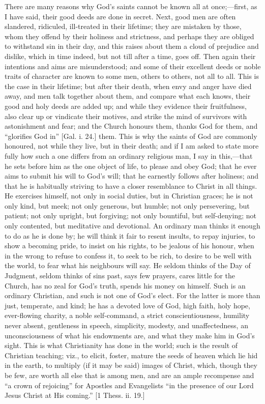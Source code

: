 There are many reasons why God's saints cannot be known all at
once;—first, as I have said, their good deeds are done in secret.
Next, good men are often slandered, ridiculed, ill-treated in their
lifetime; they are mistaken by those, whom they offend by their
holiness and strictness, and perhaps they are obliged to withstand sin
in their day, and this raises about them a cloud of prejudice and
dislike, which in time indeed, but not till after a time, goes off.
Then again their intentions and aims are misunderstood; and some of
their excellent deeds or noble traits of character are known to some
men, others to others, not all to all. This is the case in their
lifetime; but after their death, when envy and anger have died away,
and men talk together about them, and compare what each knows, their
good and holy deeds are added up; and while they evidence their
fruitfulness, also clear up or vindicate their motives, and strike the
mind of survivors with astonishment and fear; and the Church honours
them, thanks God for them, and ``glorifies God in'' [Gal. i.
24.] them. This is why the saints of God are commonly honoured, not
while they live, but in their death; and if I am asked to state more
fully how such a one differs from an ordinary religious man, I say in
this,—that he sets before him as the one object of life, to please
and obey God; that he ever aims to submit his will to God's will; that
he earnestly follows after holiness; and that he is habitually
striving to have a closer resemblance to Christ in all things. He
exercises himself, not only in social duties, but in Christian graces;
he is not only kind, but meek; not only generous, but humble; not only
persevering, but patient; not only upright, but forgiving; not only
bountiful, but self-denying; not only contented, but meditative and
devotional. An ordinary man thinks it enough to do as he is done by;
he will think it fair to resent insults, to repay injuries, to show a
becoming pride, to insist on his rights, to be jealous of his honour,
when in the wrong to refuse to confess it, to seek to be rich, to
desire to be well with the world, to fear what his neighbours will
say. He seldom thinks of the Day of Judgment, seldom thinks of sins
past, says few prayers, cares little for the Church, has no zeal for
God's truth, spends his money on himself. Such is an ordinary
Christian, and such is not one of God's elect. For the latter is more
than just, temperate, and kind; he has a devoted love of God, high
faith, holy hope, ever-flowing charity, a noble self-command, a strict
conscientiousness, humility never absent, gentleness in speech,
simplicity, modesty, and unaffectedness, an unconsciousness of what
his endowments are, and what they make him in God's sight. This is
what Christianity has done in the world; such is the result of
Christian teaching; viz., to elicit, foster, mature the seeds of
heaven which lie hid in the earth, to multiply (if it may be said)
images of Christ, which, though they be few, are worth all else that
is among men, and are an ample recompense and ``a crown of
rejoicing'' for Apostles and Evangelists ``in the presence of
our Lord Jesus Christ at His coming.'' [1 Thess. ii. 19.]

